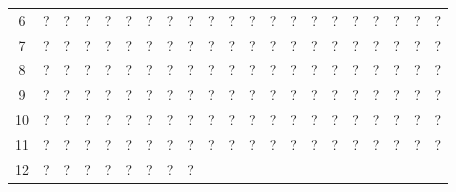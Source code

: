 \begin{figure}[H]
\begin{center}
{\begin{tabular}{|c|*{20}{c|}}
				6             & ?              & ?            & ?             & ?
				              & ?              & ?            & ?             & ?           &
				?             & ?              & ?            & ?             & ?
				              & ?              & ?            & ?             & ?
				              & ?              & ?            & ?                             \\
				7             & ?              & ?            & ?             & ?
				              & ?              & ?            & ?             & ?           &
				?             & ?              & ?            & ?             & ?
				              & ?              & ?            & ?             & ?
				              & ?              & ?            & ?                             \\
				8             & ?              & ?            & ?             & ?
				              & ?              & ?            & ?             & ?           &
				?             & ?              & ?            & ?             & ?
				              & ?              & ?            & ?             & ?
				              & ?              & ?            & ?                             \\
				9             & ?              & ?            & ?             & ?
				              & ?              & ?            & ?             & ?           &
				?             & ?              & ?            & ?             & ?
				              & ?              & ?            & ?             & ?
				              & ?              & ?            & ?                             \\
				10            & ?              & ?            & ?             & ?
				              & ?              & ?            & ?             & ?           &
				?             & ?              & ?            & ?             & ?
				              & ?              & ?            & ?             & ?
				              & ?              & ?            & ?                             \\
				11            & ?              & ?            & ?             & ?
				              & ?              & ?            & ?             & ?           &
				?             & ?              & ?            & ?             & ?
				              & ?              & ?            & ?             & ?
				              & ?              & ?            & ?                             \\
				12            & ?              & ?            & ?             & ?
				              & ?              & ?            & ?             & ?           &

\end{tabular}}
\end{center}
\end{figure}
